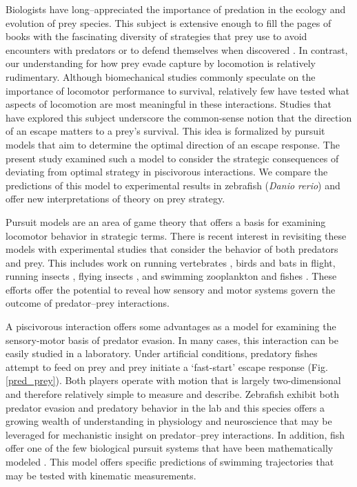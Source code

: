 \documentclass[12pt]{article}
\begin{document}
Biologists have long--appreciated the importance of predation in the ecology and evolution of prey species. This subject is extensive enough to fill the pages of books with the fascinating diversity of strategies that prey use to avoid encounters with predators \citep[e.g.][]{Ruxton:2004vb} or to defend themselves when discovered \citep[e.g.][]{Emlen:2014wb, Evans:1990va}. In contrast, our understanding for how prey evade capture by locomotion is relatively rudimentary. Although biomechanical studies commonly speculate on the importance of locomotor performance to survival, relatively few have tested what aspects of locomotion are most meaningful in these interactions. Studies that have explored this subject \citep[reviewed by][]{Domenici:2011tv} underscore the common-sense notion that the direction of an escape matters to a prey's survival. This idea is formalized by pursuit models that aim to determine the optimal direction of an escape response. The present study examined such a model \citep{Weihs:1984tb} to consider the strategic consequences of deviating from optimal strategy in piscivorous interactions. We compare the predictions of this model to experimental results in zebrafish (\textit{Danio rerio}) \citep{Stewart:2014cm} and offer new interpretations of theory on prey strategy.

Pursuit models are an area of game theory that offers a basis for examining locomotor behavior in strategic terms. There is recent interest in revisiting these models \citep[e.g.][]{Howland:1974, Weihs:1984tb} with experimental studies that consider the behavior of both predators and prey. This includes work on running vertebrates \citep[e.g.][]{Wilson:2014fd}, birds \citep[e.g.][]{Hedenstrom:2001do, Kullberg:1998ur} and bats \citep[e.g.][]{Ghose:2006dk} in flight, running insects \citep{Domenici:2008kra}, flying insects \citep[e.g.][]{Combes:2012eta}, and swimming zooplankton \citep[e.g.][]{Arnott:1999wx, Heuch:2007kk} and fishes \citep[e.g.][]{Domenici:2000un}. These efforts offer the potential to reveal how sensory and motor systems govern the outcome of predator--prey interactions. 

A piscivorous interaction offers some advantages as a model for examining the sensory-motor basis of predator evasion. In many cases, this interaction can be easily studied in a laboratory. Under artificial conditions, predatory fishes attempt to feed on prey and prey initiate a `fast-start' escape response (Fig. \ref{pred_prey}). Both players operate with motion that is largely two-dimensional and therefore relatively simple to measure and describe. Zebrafish exhibit both predator evasion and predatory behavior in the lab \citep{Stewart:2013bh} and this species offers a growing wealth of understanding in physiology and neuroscience \citep[e.g.][]{McLean:2011gi, Briggs:2002uf} that may be leveraged for mechanistic insight on predator--prey interactions. In addition, fish offer one of the few biological pursuit systems that have been mathematically modeled \citep{Weihs:1984tb}. This model offers specific predictions of swimming trajectories that may be tested with kinematic measurements. 
\end{document}
